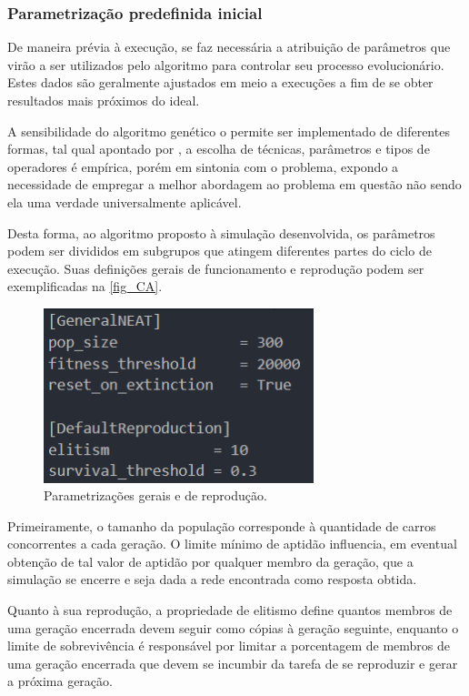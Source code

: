 \subsubsection{Parametrização predefinida inicial}
De maneira prévia à execução, se faz necessária a atribuição de parâmetros que virão a ser
utilizados pelo algoritmo para controlar seu processo evolucionário. Estes dados são geralmente
ajustados em meio a execuções a fim de se obter resultados mais próximos do ideal.

A sensibilidade do algoritmo genético o permite ser implementado de diferentes formas,
tal qual apontado por , a escolha de técnicas, parâmetros e tipos de operadores
é empírica, porém em sintonia com o problema, expondo a necessidade de empregar a melhor abordagem
ao problema em questão não sendo ela uma verdade universalmente aplicável.

Desta forma, ao algoritmo proposto à simulação desenvolvida, os parâmetros podem ser divididos em
subgrupos que atingem diferentes partes do ciclo de execução. Suas definições gerais de funcionamento
e reprodução podem ser exemplificadas na \autoref{fig_CA}.

\begin{figure}[htb]
        \centering
        \caption{\label{fig_CA}Parametrizações gerais e de reprodução.}
        \includegraphics[width=0.7\textwidth]{images/CA.png}
\end{figure}

Primeiramente, o tamanho da população corresponde à quantidade de carros concorrentes a cada geração.
O limite mínimo de aptidão influencia, em eventual obtenção de tal valor de aptidão por qualquer membro da
geração, que a simulação se encerre e seja dada a rede encontrada como resposta obtida.

Quanto à sua reprodução, a propriedade de elitismo define quantos membros de uma geração encerrada devem
seguir como cópias à geração seguinte, enquanto o limite de sobrevivência é responsável por limitar a
porcentagem de membros de uma geração encerrada que devem se incumbir da tarefa de se reproduzir e gerar a próxima geração.

